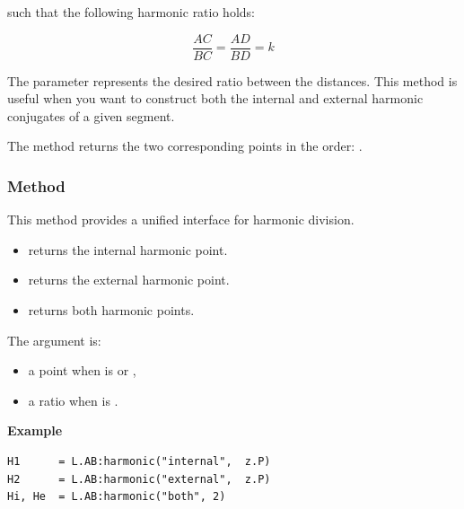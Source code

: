 such that the following harmonic ratio holds:

\[
\frac{AC}{BC} = \frac{AD}{BD} = k
\]


The parameter  represents the desired ratio between the distances. This method is useful when you want to construct both the internal and external harmonic conjugates of a given segment.

\medskip

The method returns the two corresponding points in the order: .

\vspace{2em}
\begin{tkzexample}
\begin{center}
\end{center}
\end{tkzexample}

\subsubsection{Method }
\label{ssub:harmonic}

This method provides a unified interface for harmonic division.

\begin{itemize}
  \item {} returns the internal harmonic point.
  \item {} returns the external harmonic point.
  \item {} returns both harmonic points.
\end{itemize}

The argument  is:
\begin{itemize}
  \item a point when  is  or ,
  \item a ratio when  is .
\end{itemize}

\medskip
\noindent\textbf{Example}
\begin{verbatim}
H1      = L.AB:harmonic("internal",  z.P)
H2      = L.AB:harmonic("external",  z.P)
Hi, He  = L.AB:harmonic("both", 2)
\end{verbatim}




